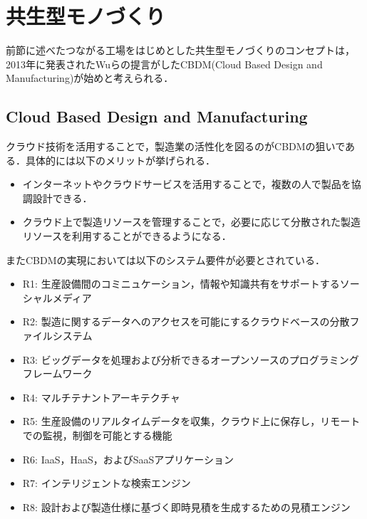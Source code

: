 \hypertarget{ux5171ux751fux578bux30e2ux30ceux3065ux304fux308a}{%
\section{共生型モノづくり}\label{ux5171ux751fux578bux30e2ux30ceux3065ux304fux308a}}

前節に述べたつながる工場をはじめとした共生型モノづくりのコンセプトは，2013年に発表されたWuらの提言がしたCBDM(Cloud
Based Design and Manufacturing)が始めと考えられる\cite{WU2013}．

\hypertarget{cloud-based-design-and-manufacturing}{%
\subsection{Cloud Based Design and
Manufacturing}\label{cloud-based-design-and-manufacturing}}

クラウド技術を活用することで，製造業の活性化を図るのがCBDMの狙いである．具体的には以下のメリットが挙げられる．

\begin{itemize}
\tightlist
\item
  インターネットやクラウドサービスを活用することで，複数の人で製品を協調設計できる．
\item
  クラウド上で製造リソースを管理することで，必要に応じて分散された製造リソースを利用することができるようになる．
\end{itemize}

またCBDMの実現においては以下のシステム要件が必要とされている\cite{WU2015}．

\begin{itemize}
\tightlist
\item
  R1:
  生産設備間のコミニュケーション，情報や知識共有をサポートするソーシャルメディア
\item
  R2:
  製造に関するデータへのアクセスを可能にするクラウドベースの分散ファイルシステム
\item
  R3:
  ビッグデータを処理および分析できるオープンソースのプログラミングフレームワーク
\item
  R4: マルチテナントアーキテクチャ
\item
  R5:
  生産設備のリアルタイムデータを収集，クラウド上に保存し，リモートでの監視，制御を可能とする機能
\item
  R6: IaaS，HaaS，およびSaaSアプリケーション
\item
  R7: インテリジェントな検索エンジン
\item
  R8: 設計および製造仕様に基づく即時見積を生成するための見積エンジン
\end{itemize}


